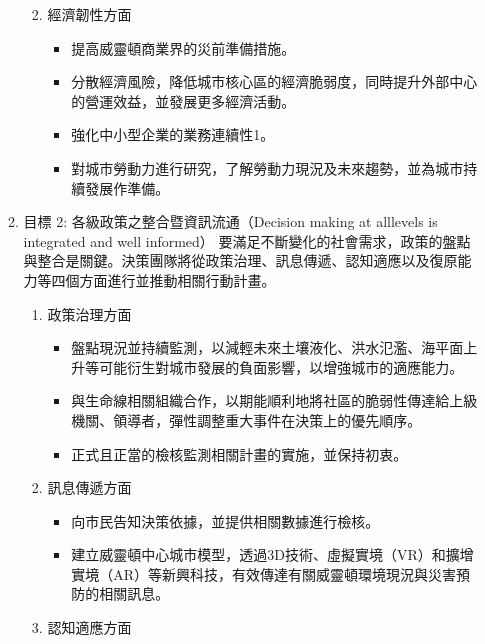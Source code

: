 \documentclass[a4paper,12pt]{article}
\begin{document}
\begin{enumerate}
\begin{enumerate}
\begin{enumerate}
\begin{itemize}
\end{itemize}
\item 經濟韌性方面
\label{sec:org3282550}
\begin{itemize}
\item 提高威靈頓商業界的災前準備措施。\\
\item 分散經濟風險，降低城市核心區的經濟脆弱度，同時提升外部中心的營運效益，並發展更多經濟活動。\\
\item 強化中小型企業的業務連續性1。\\
\item 對城市勞動力進行研究，了解勞動力現況及未來趨勢，並為城市持續發展作準備。\\
\end{itemize}
\end{enumerate}
\item 目標 2: 各級政策之整合暨資訊流通（Decision making at alllevels is integrated and well informed）
\label{sec:orgd59ef02}
要滿足不斷變化的社會需求，政策的盤點與整合是關鍵。決策團隊將從政策治理、訊息傳遞、認知適應以及復原能力等四個方面進行並推動相關行動計畫。\\
\begin{enumerate}
\item 政策治理方面
\label{sec:org3f27ea1}
\begin{itemize}
\item 盤點現況並持續監測，以減輕未來土壤液化、洪水氾濫、海平面上升等可能衍生對城市發展的負面影響，以增強城市的適應能力。\\
\item 與生命線相關組織合作，以期能順利地將社區的脆弱性傳達給上級機關、領導者，彈性調整重大事件在決策上的優先順序。\\
\item 正式且正當的檢核監測相關計畫的實施，並保持初衷。\\
\end{itemize}
\item 訊息傳遞方面
\label{sec:org066fbf1}
\begin{itemize}
\item 向市民告知決策依據，並提供相關數據進行檢核。\\
\item 建立威靈頓中心城市模型，透過3D技術、虛擬實境（VR）和擴增實境（AR）等新興科技，有效傳達有關威靈頓環境現況與災害預防的相關訊息。\\
\end{itemize}
\item 認知適應方面

\end{enumerate}
\end{enumerate}
\end{enumerate}
\end{document}
